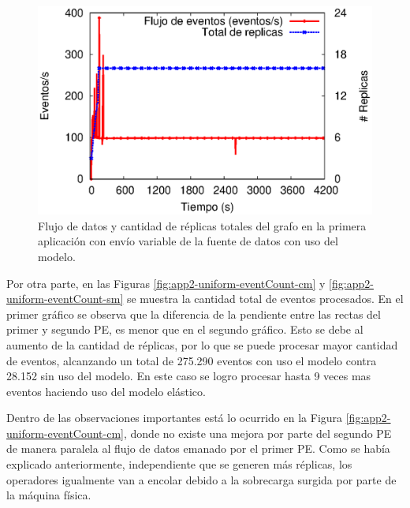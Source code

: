 \begin{figure}[!ht]
	\centering
	\includegraphics[scale=0.7]{images/exp/app2/uniform/cm/processSystem.eps}
    \caption{Flujo de datos y cantidad de réplicas totales del grafo en la primera aplicación con envío variable de la fuente de datos con uso del modelo.}
	\label{fig:app2-uniform-processSystem-cm}
\end{figure}



Por otra parte, en las Figuras \ref{fig:app2-uniform-eventCount-cm} y \ref{fig:app2-uniform-eventCount-sm} se muestra la cantidad total de eventos procesados. En el primer gráfico se observa que la diferencia de la pendiente entre las rectas del primer y segundo PE, es menor que en el segundo gráfico. Esto se debe al aumento de la cantidad de réplicas, por lo que se puede procesar mayor cantidad de eventos, alcanzando un total de 275.290 eventos con uso el modelo contra 28.152 sin uso del modelo. En este caso se logro procesar hasta 9 veces mas eventos haciendo uso del modelo elástico.

Dentro de las observaciones importantes está lo ocurrido en la Figura \ref{fig:app2-uniform-eventCount-cm}, donde no existe una mejora por parte del segundo PE de manera paralela al flujo de datos emanado por el primer PE. Como se había explicado anteriormente, independiente que se generen más réplicas, los operadores igualmente van a encolar debido a la sobrecarga surgida por parte de la máquina física.

